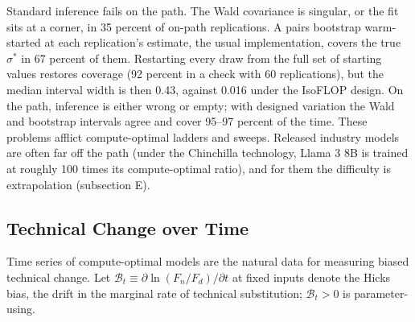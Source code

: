 Standard inference fails on the path. The Wald covariance is singular, or the fit sits at a corner, in 35 percent of
on-path replications. A pairs bootstrap warm-started at each replication's estimate, the usual implementation, covers the
true $\sigma^*$ in 67 percent of them. Restarting every draw from the full set of starting values restores coverage
(92 percent in a check with 60 replications), but the median interval width is then 0.43, against 0.016 under the
IsoFLOP design. On the path, inference is either wrong or empty; with designed variation the Wald and bootstrap
intervals agree and cover 95--97 percent of the time. These problems afflict compute-optimal ladders and sweeps.
Released industry models are often far off the path (under the Chinchilla technology, Llama 3 8B is trained at roughly
100 times its compute-optimal ratio), and for them the difficulty is extrapolation (subsection E).

\subsection{Technical Change over Time}\label{sec:ident-dmr}

Time series of compute-optimal models are the natural data for measuring biased technical change. Let
$\mathcal B_t\equiv\partial\ln(F_n/F_d)/\partial t$ at fixed inputs denote the Hicks bias, the drift in the marginal rate
of technical substitution; $\mathcal B_t>0$ is parameter-using.


